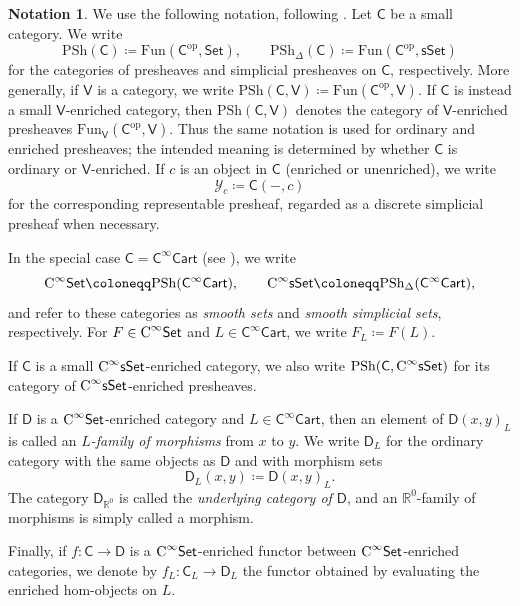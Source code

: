 \documentclass{amsart}
\newcommand{\cat}[1]{\mathsf{#1}}
\newcommand{\Set}{\cat{Set}}
\newcommand{\sset}{\cat{sSet}}
\newcommand{\CSet}{\textnormal{C}^{\infty}\Set}
\newcommand{\CsSet}{\textnormal{C}^{\infty}\sset}
\newcommand{\Cart}{\cat{C}^{\infty}\cat{Cart}}
\newcommand{\Fun}{\mathrm{Fun}}
\newcommand{\psh}{\mathrm{PSh}}
\newcommand{\spsh}{\mathrm{PSh}_{\Delta}}
\newcommand{\RR}{{\mathbb{R}}}
\renewcommand{\op}{\mathrm{op}}
\newcommand{\Yo}{\mathscr{Y}}
\theoremstyle{definition}
\newtheorem{notation}[equation]{Notation}
\numberwithin{equation}{subsection}
\numberwithin{subsubsection}{subsection}
\begin{document}
\begin{notation}\label{def:simplicial.presheaves}
  We use the following notation, following
  \textnormal{\cite[Notation~2.2.1-2]{GP26}}. Let \( \cat{C} \)
  be a small category. We write
  \[
    \psh(\cat{C})\coloneqq \Fun(\cat{C}^{\op},\Set),
    \qquad
    \spsh(\cat{C})\coloneqq \Fun(\cat{C}^{\op},\sset)
  \]
  for the categories of presheaves and simplicial presheaves on
  \( \cat{C} \), respectively. More generally, if \( \cat{V} \) is a
  category, we write
  \(\psh(\cat{C},\cat{V})\coloneqq\Fun(\cat{C}^{\op},\cat{V})\). If \(\cat{C}\)
  is instead a small \(\cat{V}\)-enriched category, then
  \(\psh(\cat{C},\cat{V})\) denotes the category of \(\cat{V}\)-enriched
  presheaves \(\Fun_{\cat{V}}(\cat{C}^{\op},\cat{V})\). Thus the same notation
  is used for ordinary and enriched presheaves; the
  intended meaning is determined by whether \(\cat{C}\) is ordinary or
  \(\cat{V}\)-enriched. If \( c\) is an object in \(\cat{C} \) (enriched or
  unenriched), we write
  \[
    \Yo_c\coloneqq \cat{C}(-,c)
  \]
  for the corresponding representable presheaf, regarded as a discrete
  simplicial presheaf when necessary.

  In the special case \( \cat{C}=\Cart \)
  (see ), we write
  \[
    \CSet\coloneqq \psh(\Cart),
    \qquad
    \CsSet\coloneqq \spsh(\Cart),
  \]
  and refer to these categories as \emph{smooth sets} and \emph{smooth
  simplicial sets}, respectively.
  For \(F\in \CSet\) and \(L\in \Cart\), we write
  \(F_L\coloneqq F(L)\).

  If \(\cat{C}\) is a small \(\CsSet\)-enriched category, we also
  write \( \psh(\cat{C},\CsSet) \) for its category of \(\CsSet\)-enriched
  presheaves.

  If \( \cat{D} \) is a \( \CSet \)-enriched category and
  \(L\in \Cart\), then an element of \( \cat{D}(x,y)_L \) is called an
  \emph{\(L\)-family of morphisms} from \(x\) to \(y\). We write
  \( \cat{D}_L \) for the ordinary category with the same objects as
  \( \cat{D} \) and with morphism sets
  \[
    \cat{D}_L(x,y)\coloneqq \cat{D}(x,y)_L.
  \]
  The category \( \cat{D}_{\RR^0} \) is called the \emph{underlying category
  of \( \cat{D} \)}, and an \( \RR^0 \)-family of morphisms is simply
  called a morphism.

  Finally, if \( f:\cat{C}\to\cat{D} \) is a \( \CSet \)-enriched
  functor between \( \CSet \)-enriched categories, we denote by
  \( f_L:\cat{C}_L\to\cat{D}_L \) the functor obtained by evaluating the
  enriched hom-objects on \(L\).
\end{notation}
\end{document}
